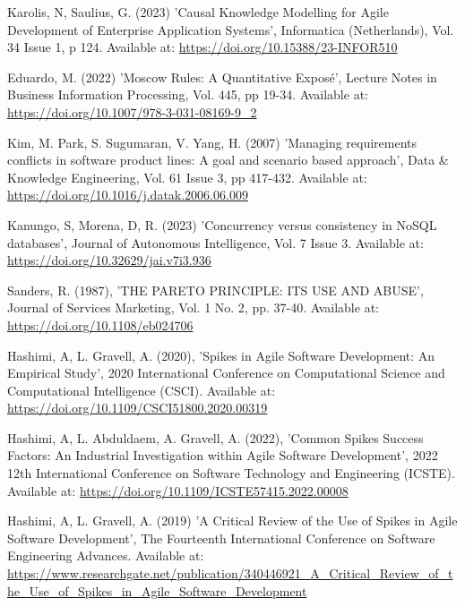 \noindent Karolis, N, Saulius, G. (2023) 'Causal Knowledge Modelling for Agile Development of Enterprise Application Systems', Informatica (Netherlands), Vol. 34 Issue 1, p 124. Available at: \url{https://doi.org/10.15388/23-INFOR510}
\vspace{0.2cm}

\noindent Eduardo, M. (2022) 'Moscow Rules: A Quantitative Exposé', Lecture Notes in Business Information Processing, Vol. 445, pp 19-34. Available at: \url{https://doi.org/10.1007/978-3-031-08169-9_2}
\vspace{0.2cm}

\noindent Kim, M. Park, S. Sugumaran, V. Yang, H. (2007) 'Managing requirements conflicts in software product lines: A goal and scenario based approach', Data \& Knowledge Engineering, Vol. 61 Issue 3, pp 417-432. Available at: \url{https://doi.org/10.1016/j.datak.2006.06.009}
\vspace{0.2cm}

\noindent Kanungo, S, Morena, D, R. (2023) 'Concurrency versus consistency in NoSQL databases', Journal of Autonomous Intelligence, Vol. 7 Issue 3. Available at: \url{https://doi.org/10.32629/jai.v7i3.936}
\vspace{0.2cm}

\noindent Sanders, R. (1987), 'THE PARETO PRINCIPLE: ITS USE AND ABUSE', Journal of Services Marketing, Vol. 1 No. 2, pp. 37-40. Available at: \url{https://doi.org/10.1108/eb024706}
\vspace{0.2cm}

\noindent Hashimi, A, L. Gravell, A. (2020), 'Spikes in Agile Software Development: An Empirical Study', 2020 International Conference on Computational Science and Computational Intelligence (CSCI). Available at: \url{https://doi.org/10.1109/CSCI51800.2020.00319}
\vspace{0.2cm}

\noindent Hashimi, A, L. Abduldaem, A. Gravell, A. (2022), 'Common Spikes Success Factors: An Industrial Investigation within Agile Software Development', 2022 12th International Conference on Software Technology and Engineering (ICSTE). Available at: \url{https://doi.org/10.1109/ICSTE57415.2022.00008}
\vspace{0.2cm}

\noindent Hashimi, A, L. Gravell, A. (2019) 'A Critical Review of the Use of Spikes in Agile Software Development', The Fourteenth International Conference on Software Engineering Advances. Available at: \url{https://www.researchgate.net/publication/340446921_A_Critical_Review_of_the_Use_of_Spikes_in_Agile_Software_Development}
\vspace{0.2cm}

